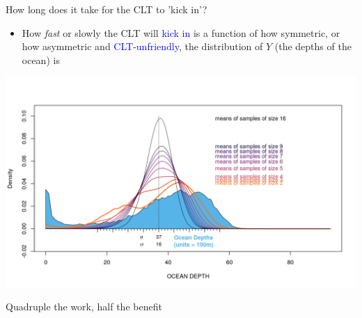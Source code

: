 \documentclass[10pt,handout]{beamer}\usepackage[]{graphicx}\usepackage[]{color}
\begin{document}
\begin{frame}[fragile]{How long does it take for the CLT to 'kick in'?}
	\begin{itemize}
		\item How \textit{fast} or slowly the CLT will \textcolor{blue}{kick in} is a function of how symmetric, or how asymmetric and \textcolor{blue}{CLT-unfriendly}, the distribution of $Y$ (the depths of the ocean) is
	\end{itemize}
	
	
	\includegraphics[width=\textwidth,height=0.8\textheight,keepaspectratio]{oceanAll.png}
\end{frame}



\begin{frame}[fragile]{Quadruple the work, half the benefit}
	
\end{frame}
\end{document}
